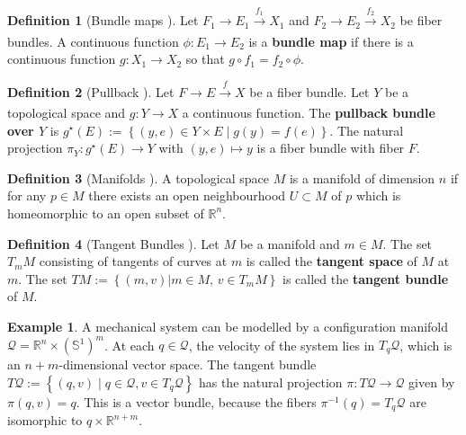 \documentclass[12pt]{article}
\theoremstyle{definition}
\newtheorem{defn}{Definition}
\newtheorem{example}{Example}
\begin{document}
\begin{defn}[Bundle maps \cite{topology-fiber-bundles}]
    Let \(F_1 \rightarrow E_1 \xrightarrow[]{f_1} X_1\) and 
    \(F_2 \rightarrow E_2 \xrightarrow[]{f_2} X_2\) be fiber bundles. A
    continuous function \(\phi : E_1 \rightarrow E_2\) is a \textbf{bundle map}
    if there is a continuous function \(g : X_1 \rightarrow X_2\) so that
    \(g \circ f_1 = f_2 \circ \phi\).
\end{defn}

\begin{defn}[Pullback \cite{topology-fiber-bundles}]
    Let \(F \rightarrow E \xrightarrow[]{f} X\) be a fiber bundle. Let \(Y\) be
    a topological space and \(g : Y \rightarrow X\) a continuous function. The
    \textbf{pullback bundle over \(Y\)} is 
    \(g^\star(E) := \left\{ (y,e)\in Y \times E \mid g(y) = f(e)\right\}\). The
    natural projection \(\pi_Y : g^\star(E) \rightarrow Y\) with 
    \((y,e) \mapsto y\) is a fiber bundle with fiber \(F\).
\end{defn}

\begin{defn}[Manifolds \cite{intro-top-manifolds}]
    A topological space \(M\) is a manifold of dimension \(n\) if for any
    \(p \in M\) there exists an open neighbourhood \(U \subset M\) of \(p\)
    which is homeomorphic to an open subset of \(\mathbb{R}^n\).
\end{defn}

\begin{defn}[Tangent Bundles \cite{geometric-control}]
    Let \(M\) be a manifold and \(m \in M\). The set \(T_mM\) consisting of
    tangents of curves at \(m\) is called the \textbf{tangent space} of \(M\) at
    \(m\). The set \(TM := \left\{(m,v) | m \in M,\, v \in T_mM\right\}\) is
    called the \textbf{tangent bundle} of \(M\).
\end{defn}

\begin{example}\label{ex:tangent-bundle}
    A mechanical system can be modelled by a configuration manifold
    \(\mathcal{Q} = \mathbb{R}^n \times (\mathbb{S}^1)^m\). At each
    \(q \in \mathcal{Q}\), the velocity of the system lies in
    \(T_q\mathcal{Q}\), which is an \(n+m\)-dimensional vector
    space. 
    The tangent bundle
    \(T\mathcal{Q} := \left\{(q,v) \mid q \in \mathcal{Q}, v \in
    T_q\mathcal{Q}\right\}\)  has the natural
    projection \(\pi : T\mathcal{Q} \rightarrow \mathcal{Q}\) given by 
    \(\pi(q,v) = q\). This is a vector bundle, because the fibers 
    \(\pi^{-1}(q) = T_q\mathcal{Q}\) are isomorphic to 
    \({q} \times \mathbb{R}^{n+m}\).
\end{example}
\end{document}
